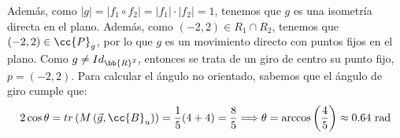\begin{ejercicio}
\begin{enumerate}
        Además, como $|g|=|f_1\circ f_2| = |f_1|\cdot |f_2| = 1$, tenemos que $g$ es una isometría directa en el plano. Además, como
        $(-2,2) \in R_1\cap R_2$, tenemos que $(-2,2)\in \cc{P}_g$, por lo que $g$ es un movimiento directo con puntos fijos en el plano.
        Como $g\neq Id_{\bb{R}^2}$, entonces se trata de un giro de centro su punto fijo, $p=(-2,2)$. Para calcular el ángulo no orientado, sabemos que el ángulo de giro cumple que:
        \begin{equation*}
            2\cos \theta = {tr\left(M\left(\vec{g},\cc{B}_u\right)\right)} = \frac{1}{5}(4+4) = \frac{8}{5} \Longrightarrow \theta = \arccos \left(\frac{4}{5}\right) \approx 0.64 \text{ rad}
        \end{equation*}
    \end{enumerate}
\end{ejercicio}

